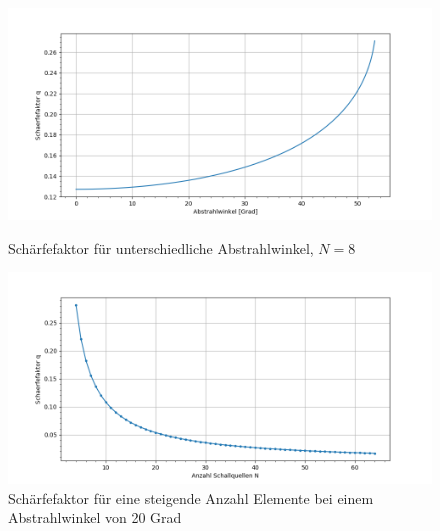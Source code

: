 \begin{figure}[htb]
\begin{center}
\includegraphics[width=\textwidth]{graphics/plot_grundlagen_sharpness_factor_calc_0.png}
\end{center}
\caption{Schärfefaktor für unterschiedliche Abstrahlwinkel, $N = 8$} %
\label{fig:plot_grundlagen_sharpness_factor_calc_0}
%

\begin{center}
\includegraphics[width=\textwidth]{graphics/plot_grundlagen_sharpness_factor_calc_1.png}
\end{center}
\caption{Schärfefaktor für eine steigende Anzahl Elemente bei einem Abstrahlwinkel von 20 Grad} %
\label{fig:plot_grundlagen_sharpness_factor_calc_1}
\end{figure}
%

